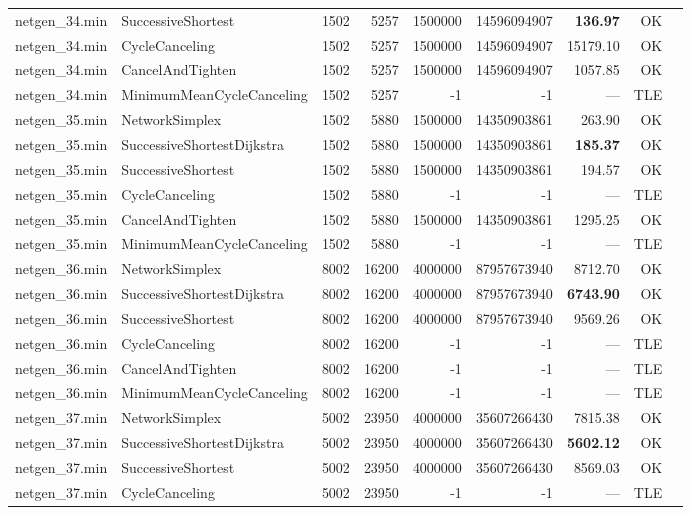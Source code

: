 \begin{longtable}{llrrrrrrl}
netgen\_34.min & SuccessiveShortest & 1502 & 5257 & 1500000 & 14596094907 & \textbf{136.97} & OK \\
netgen\_34.min & CycleCanceling & 1502 & 5257 & 1500000 & 14596094907 & 15179.10 & OK \\
netgen\_34.min & CancelAndTighten & 1502 & 5257 & 1500000 & 14596094907 & 1057.85 & OK \\
netgen\_34.min & MinimumMeanCycleCanceling & 1502 & 5257 & -1 & -1 & --- & TLE \\
\midrule
netgen\_35.min & NetworkSimplex & 1502 & 5880 & 1500000 & 14350903861 & 263.90 & OK \\
netgen\_35.min & SuccessiveShortestDijkstra & 1502 & 5880 & 1500000 & 14350903861 & \textbf{185.37} & OK \\
netgen\_35.min & SuccessiveShortest & 1502 & 5880 & 1500000 & 14350903861 & 194.57 & OK \\
netgen\_35.min & CycleCanceling & 1502 & 5880 & -1 & -1 & --- & TLE \\
netgen\_35.min & CancelAndTighten & 1502 & 5880 & 1500000 & 14350903861 & 1295.25 & OK \\
netgen\_35.min & MinimumMeanCycleCanceling & 1502 & 5880 & -1 & -1 & --- & TLE \\
\midrule
netgen\_36.min & NetworkSimplex & 8002 & 16200 & 4000000 & 87957673940 & 8712.70 & OK \\
netgen\_36.min & SuccessiveShortestDijkstra & 8002 & 16200 & 4000000 & 87957673940 & \textbf{6743.90} & OK \\
netgen\_36.min & SuccessiveShortest & 8002 & 16200 & 4000000 & 87957673940 & 9569.26 & OK \\
netgen\_36.min & CycleCanceling & 8002 & 16200 & -1 & -1 & --- & TLE \\
netgen\_36.min & CancelAndTighten & 8002 & 16200 & -1 & -1 & --- & TLE \\
netgen\_36.min & MinimumMeanCycleCanceling & 8002 & 16200 & -1 & -1 & --- & TLE \\
\midrule
netgen\_37.min & NetworkSimplex & 5002 & 23950 & 4000000 & 35607266430 & 7815.38 & OK \\
netgen\_37.min & SuccessiveShortestDijkstra & 5002 & 23950 & 4000000 & 35607266430 & \textbf{5602.12} & OK \\
netgen\_37.min & SuccessiveShortest & 5002 & 23950 & 4000000 & 35607266430 & 8569.03 & OK \\
netgen\_37.min & CycleCanceling & 5002 & 23950 & -1 & -1 & --- & TLE \\

\end{longtable}
